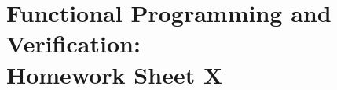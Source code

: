 \documentclass[12pt,a4paper,oneside]{article}
\begin{document}
\section*{Functional Programming and Verification:\\ Homework Sheet X}

%
\end{document}
